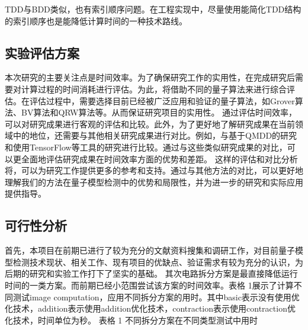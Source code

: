 TDD与BDD类似，也有索引顺序问题。在工程实现中，尽量使用能简化TDD结构的索引顺序也是能降低计算时间的一种技术路线。
\subsection{实验评估方案}
本次研究的主要关注点是时间效率。为了确保研究工作的实用性，在完成研究后需要对计算过程的时间消耗进行评估。为此，将借助不同的量子算法来进行综合评估。在评估过程中，需要选择目前已经被广泛应用和验证的量子算法，如Grover算法、BV算法和QRW算法等。从而保证研究项目的实用性。
通过评估时间效率，可以对研究成果进行客观的评估和比较。此外，为了更好地了解研究成果在当前领域中的地位，还需要与其他相关研究成果进行对比。例如，与基于QMDD的研究和使用TensorFlow等工具的研究进行比较。通过与这些类似研究成果的对比，可以更全面地评估研究成果在时间效率方面的优势和差距。
这样的评估和对比分析将，可以为研究工作提供更多的参考和支持。通过与其他方法的对比，可以更好地理解我们的方法在量子模型检测中的优势和局限性，并为进一步的研究和实际应用提供指导。
\subsection{可行性分析}
首先，本项目在前期已进行了较为充分的文献资料搜集和调研工作，对目前量子模型检测技术现状、相关工作、现有项目的优缺点、验证需求有较为充分的认识，为后期的研究和实验工作打下了坚实的基础。
其次电路拆分方案是最直接降低运行时间的一类方案。而前期已经小范围尝试该方案的时间效率。表格 1展示了计算不同测试image computation，应用不同拆分方案的用时。其中basic表示没有使用优化技术，addition表示使用addition优化技术，contraction表示使用contraction优化技术，时间单位为秒。
表格 1 不同拆分方案在不同类型测试中用时

